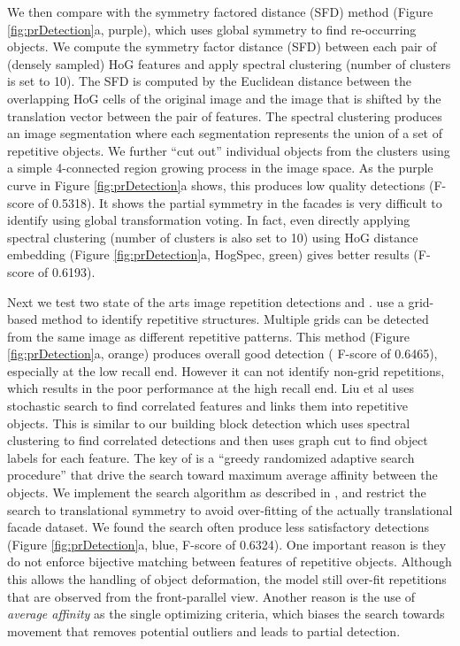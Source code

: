 \documentclass{acmtog}
\begin{document}
We then compare with the symmetry factored distance (SFD) method \cite{LIPMANsig2010} (Figure \ref{fig:prDetection}a, purple), which uses global symmetry to find re-occurring objects. We compute the symmetry factor distance (SFD) between each pair of (densely sampled) HoG features and apply spectral clustering (number of clusters is set to 10). The SFD is computed by the Euclidean distance between the overlapping HoG cells of the original image and the image that is shifted by the translation vector between the pair of features. The spectral clustering produces an image segmentation where each segmentation represents the union of a set of repetitive objects. We further ``cut out'' individual objects from the clusters using a simple 4-connected region growing process in the image space. As the purple curve in Figure \ref{fig:prDetection}a shows, this produces low quality detections (F-score of 0.5318). It shows the partial symmetry in the facades is very difficult to identify using global transformation voting. In fact, even directly applying spectral clustering (number of clusters is also set to 10) using HoG distance embedding (Figure \ref{fig:prDetection}a, HogSpec, green) gives better results (F-score of 0.6193).

Next we test two state of the arts image repetition detections \cite{Wu2010DL} and \cite{Liu2013GRASP}. \cite{Wu2010DL} use a grid-based method to identify repetitive structures. Multiple grids can be detected from the same image as different repetitive patterns. This method (Figure \ref{fig:prDetection}a, orange) produces overall good detection ( F-score of 0.6465), especially at the low recall end. However it can not identify non-grid repetitions, which results in the poor performance at the high recall end. Liu et al \cite{Liu2013GRASP} uses stochastic search to find correlated features and links them into repetitive objects. This is similar to our building block detection which uses spectral clustering to find correlated detections and then uses graph cut to find object labels for each feature. The key of \cite{Liu2013GRASP} is a ``greedy randomized adaptive search procedure'' that drive the search toward maximum average affinity between the objects. We implement the search algorithm as described in \cite{Liu2013GRASP}, and restrict the search to translational symmetry to avoid over-fitting of the actually translational facade dataset. We found the search often produce less satisfactory detections (Figure \ref{fig:prDetection}a, blue, F-score of 0.6324). One important reason is they do not enforce bijective matching between features of repetitive objects. Although this allows the handling of object deformation, the model still over-fit repetitions that are observed from the front-parallel view. Another reason is the use of \emph{average affinity} as the single optimizing criteria, which biases the search towards movement that removes potential outliers and leads to partial detection.  
\end{document}
